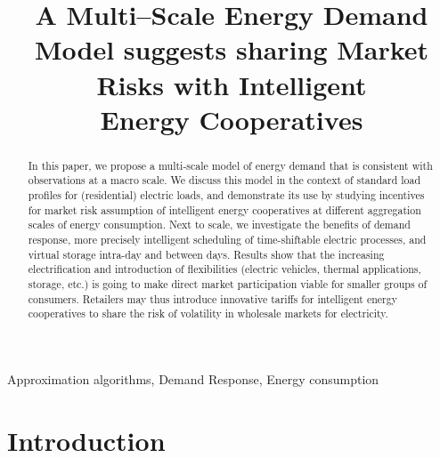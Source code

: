 \documentclass[conference]{IEEEtran}
\begin{document}
\title{A Multi--Scale Energy Demand Model suggests sharing Market Risks with Intelligent\\ Energy Cooperatives}
\author{
}

\maketitle

\begin{abstract} In this paper, we propose a multi-scale model of energy demand that is consistent with observations at a macro scale. We discuss this model in the context of standard load profiles for (residential) electric loads, and demonstrate its use by studying incentives for market risk assumption of intelligent energy cooperatives at different aggregation scales of energy consumption. Next to scale, we investigate the benefits of demand response, more precisely intelligent scheduling of time-shiftable electric processes, and virtual storage intra-day and between days. Results show that the increasing electrification and introduction of flexibilities (electric vehicles, thermal applications, storage, etc.) is going to make direct market participation viable for smaller groups of consumers. Retailers may thus introduce innovative tariffs for intelligent energy cooperatives to share the risk of volatility in wholesale markets for electricity.
\end{abstract}

\begin{keywords}
Approximation algorithms, Demand Response, Energy consumption
\end{keywords}

\IEEEpeerreviewmaketitle

\section{Introduction}
\label{sec:Introduction}
\end{document}
